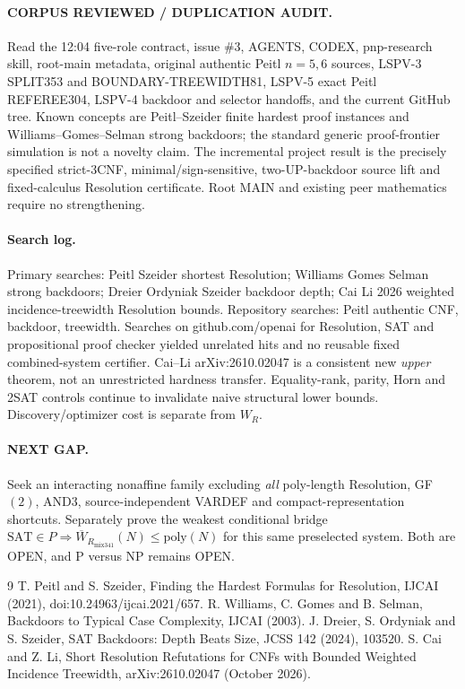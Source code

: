 \documentclass[11pt]{article}
\begin{document}
\paragraph{CORPUS REVIEWED / DUPLICATION AUDIT.} Read the 12:04 five-role contract, issue \#3, AGENTS, CODEX, pnp-research skill, root-main metadata, original authentic Peitl $n=5,6$ sources, LSPV-3 SPLIT353 and BOUNDARY-TREEWIDTH81, LSPV-5 exact Peitl REFEREE304, LSPV-4 backdoor and selector handoffs, and the current GitHub tree. Known concepts are Peitl--Szeider finite hardest proof instances and Williams--Gomes--Selman strong backdoors; the standard generic proof-frontier simulation is not a novelty claim. The incremental project result is the precisely specified strict-3CNF, minimal/sign-sensitive, two-UP-backdoor source lift and fixed-calculus Resolution certificate. Root MAIN and existing peer mathematics require no strengthening.

\paragraph{Search log.} Primary searches: Peitl Szeider shortest Resolution; Williams Gomes Selman strong backdoors; Dreier Ordyniak Szeider backdoor depth; Cai Li 2026 weighted incidence-treewidth Resolution bounds. Repository searches: Peitl authentic CNF, backdoor, treewidth. Searches on github.com/openai for Resolution, SAT and propositional proof checker yielded unrelated hits and no reusable fixed combined-system certifier. Cai--Li arXiv:2610.02047 is a consistent new \emph{upper} theorem, not an unrestricted hardness transfer. Equality-rank, parity, Horn and 2SAT controls continue to invalidate naive structural lower bounds. Discovery/optimizer cost is separate from $W_R$.

\paragraph{NEXT GAP.} Seek an interacting nonaffine family excluding \emph{all} poly-length Resolution, GF$(2)$, AND3, source-independent VARDEF and compact-representation shortcuts. Separately prove the weakest conditional bridge $\mathrm{SAT}\in P\Rightarrow \overline W_{R_{\mathrm{mix341}}}(N)\le\mathrm{poly}(N)$ for this same preselected system. Both are OPEN, and P versus NP remains OPEN.

\begin{thebibliography}{9}
 T. Peitl and S. Szeider, Finding the Hardest Formulas for Resolution, IJCAI (2021), doi:10.24963/ijcai.2021/657.
 R. Williams, C. Gomes and B. Selman, Backdoors to Typical Case Complexity, IJCAI (2003).
 J. Dreier, S. Ordyniak and S. Szeider, SAT Backdoors: Depth Beats Size, JCSS 142 (2024), 103520.
 S. Cai and Z. Li, Short Resolution Refutations for CNFs with Bounded Weighted Incidence Treewidth, arXiv:2610.02047 (October 2026).
\end{thebibliography}
\end{document}
